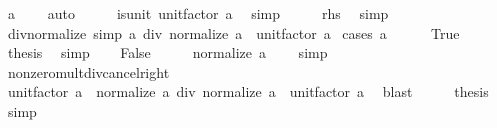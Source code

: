 \begin{isabellebody}
\ {\isachardoublequoteopen}a\ {\isasymnoteq}\ {}{\isachardoublequoteclose}\ \isamarkupfalse%
\ auto\isanewline
\ \ \isamarkupfalse%
\ \isamarkupfalse%
\ {\isachardoublequoteopen}is{\isacharunderscore}{\kern0pt}unit\ {\isacharparenleft}{\kern0pt}unit{\isacharunderscore}{\kern0pt}factor\ a{\isacharparenright}{\kern0pt}{\isachardoublequoteclose}\ \isamarkupfalse%
\ simp\isanewline
\ \ \isamarkupfalse%
\ \isamarkupfalse%
\ {\isacharquery}{\kern0pt}rhs\ \isamarkupfalse%
\ simp\isanewline
{}\isamarkupfalse%
%
\endisatagproof
{\isafoldproof}%
%
\isadelimproof
\isanewline
%
\endisadelimproof
\isanewline
{}\isamarkupfalse%
\ div{\isacharunderscore}{\kern0pt}normalize\ {\isacharbrackleft}{\kern0pt}simp{\isacharbrackright}{\kern0pt}{\isacharcolon}{\kern0pt}\ {\isachardoublequoteopen}a\ div\ normalize\ a\ {\isacharequal}{\kern0pt}\ unit{\isacharunderscore}{\kern0pt}factor\ a{\isachardoublequoteclose}\isanewline
%
\isadelimproof
%
\endisadelimproof
%
\isatagproof
{}\isamarkupfalse%
\ {\isacharparenleft}{\kern0pt}cases\ {\isachardoublequoteopen}a\ {\isacharequal}{\kern0pt}\ {}{\isachardoublequoteclose}{\isacharparenright}{\kern0pt}\isanewline
\ \ \isamarkupfalse%
\ True\isanewline
\ \ \isamarkupfalse%
\ \isamarkupfalse%
\ {\isacharquery}{\kern0pt}thesis\ \isamarkupfalse%
\ simp\isanewline
{}\isamarkupfalse%
\isanewline
\ \ \isamarkupfalse%
\ False\isanewline
\ \ \isamarkupfalse%
\ \isamarkupfalse%
\ {\isachardoublequoteopen}normalize\ a\ {\isasymnoteq}\ {}{\isachardoublequoteclose}\ \isamarkupfalse%
\ simp\isanewline
\ \ \isamarkupfalse%
\ nonzero{\isacharunderscore}{\kern0pt}mult{\isacharunderscore}{\kern0pt}div{\isacharunderscore}{\kern0pt}cancel{\isacharunderscore}{\kern0pt}right\isanewline
\ \ \isamarkupfalse%
\ {\isachardoublequoteopen}unit{\isacharunderscore}{\kern0pt}factor\ a\ {\isacharasterisk}{\kern0pt}\ normalize\ a\ div\ normalize\ a\ {\isacharequal}{\kern0pt}\ unit{\isacharunderscore}{\kern0pt}factor\ a{\isachardoublequoteclose}\ \isamarkupfalse%
\ blast\isanewline
\ \ \isamarkupfalse%
\ \isamarkupfalse%
\ {\isacharquery}{\kern0pt}thesis\ \isamarkupfalse%
\ simp\isanewline
{}\isamarkupfalse%
%
\endisatagproof

\end{isabellebody}
